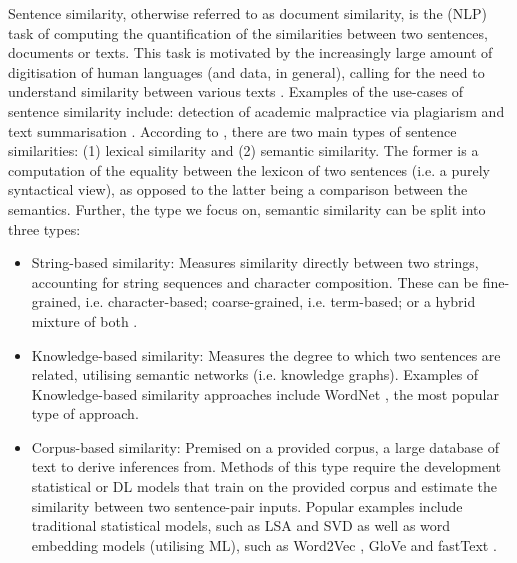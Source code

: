 \documentclass[10pt,oneside]{report}
\begin{document}
Sentence similarity, otherwise referred to as document similarity, is the (NLP) task of computing the quantification of the similarities between two sentences, documents or texts. This task is motivated by the increasingly large amount of digitisation of human languages (and data, in general), calling for the need to understand similarity between various texts \cite{raju2022sentence}. Examples of the use-cases of sentence similarity include: detection of academic malpractice via plagiarism \cite{lukashenko2007computer, baba2017plagiarism} and text summarisation \cite {aliguliyev2009new, kumar2020semantic, jo2017k}. According to \cite{raju2022sentence}, there are two main types of sentence similarities: (1) lexical similarity and (2) semantic similarity. The former is a computation of the equality between the lexicon of two sentences (i.e. a purely syntactical view), as opposed to the latter  being a comparison between the semantics. Further, the type we focus on, semantic similarity can be split into three types: 

\begin{itemize}
    \item String-based similarity: Measures similarity directly between two strings, accounting for string sequences and character composition. These can be fine-grained, i.e. character-based; coarse-grained, i.e. term-based; or a hybrid mixture of both \cite{yu2016string}.
    \item Knowledge-based similarity: Measures the degree to which two sentences are related, utilising semantic networks (i.e. knowledge graphs). Examples of Knowledge-based similarity approaches include WordNet \cite{budanitsky2001semantic}, the most popular type of approach.
    \item Corpus-based similarity: Premised on a provided corpus, a large database of text to derive inferences from. Methods of this type require the development statistical or DL models that train on the provided corpus and estimate the similarity between two sentence-pair inputs. Popular examples include traditional statistical models, such as LSA \cite{landauer1998introduction} and SVD \cite{steinberger2005text} as well as word embedding models (utilising ML), such as Word2Vec \cite{bojanowski2017enriching}, GloVe \cite{pennington2014glove} and fastText \cite{mikolov2013efficient}.
\end{itemize}
\end{document}
